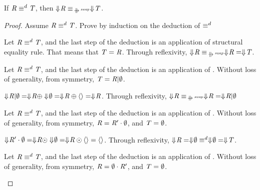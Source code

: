 \documentclass[numbers,10pt,preprint\ifanon ,nocopyrightspace\fi]{sigplanconf}
\begin{document}
\begin{lemma}
  \label{lem:express-equiv-in-equiv-swap}
  If $\mathit{R} \equiv^d \mathit{T}$, then
  $\ToDNFRegexOf{\Regex} \EquivalenceOf{\ParallelRewriteSwap}
  \ToDNFRegexOf{\RegexAlt}$.
\end{lemma}
\begin{proof}
  Assume $\mathit{R} \equiv^d \mathit{T}$.
  Prove by induction on the deduction of $\equiv^d$
  \begin{case}
    Let $\mathit{R} \equiv^d \mathit{T}$, and the last step of the
    deduction is an application of structural equality rule.
    That means that $\mathit{T}
    = \mathit{R}$.  Through reflexivity, $\ToDNFRegexOf{\Regex}
    \EquivalenceOf{\ParallelRewriteSwap} \ToDNFRegexOf{\Regex} =
    \ToDNFRegexOf{\RegexAlt}$.
  \end{case}

  \begin{case}[\OrIdentityRule{}]
    Let $\mathit{R} \equiv^d \mathit{T}$, and the last step of the
    deduction is an application of \OrIdentityRule{}.  Without loss of
    generality, from symmetry, $\mathit{T} = \mathit{R} | \emptyset$.
  
    $\Downarrow\mkern-4mu \mathit{R} | \emptyset = \Downarrow\mkern-4mu \mathit{R} \oplus
    \Downarrow\mkern-4mu \emptyset = \Downarrow\mkern-4mu \mathit{R} \oplus \langle\rangle =
    \Downarrow\mkern-4mu \mathit{R}$.  Through reflexivity, $\ToDNFRegexOf{\Regex}
    \EquivalenceOf{\ParallelRewriteSwap} \ToDNFRegexOf{\Regex} =
    \ToDNFRegexOf{\Regex \Or \emptyset}$
  \end{case}
  
  \begin{case}[\EmptyProjectionRightRule{}]
    Let $\mathit{R} \equiv^d \mathit{T}$, and the last step of the
    deduction is an application of \EmptyProjectionRightRule{}.  Without
    loss of generality, from symmetry, $\mathit{R} = \mathit{R}' \cdot \emptyset$, and
    $\mathit{T} = \emptyset$.

    $\Downarrow\mkern-4mu \mathit{R}' \cdot \emptyset = \Downarrow\mkern-4mu \mathit{R} \odot
    \Downarrow\mkern-4mu \emptyset = \Downarrow\mkern-4mu \mathit{R} \odot \langle\rangle =
    \langle\rangle$.  Through reflexivity, $\Downarrow\mkern-4mu \mathit{R} =
    \Downarrow\mkern-4mu \emptyset \equiv^d \Downarrow\mkern-4mu \emptyset =
    \Downarrow\mkern-4mu \mathit{T}$.
  \end{case}
  
  \begin{case}[\EmptyProjectionLeftRule{}]
    Let $\mathit{R} \equiv^d \mathit{T}$, and the last step of the
    deduction is an application of \EmptyProjectionRightRule{}.  Without
    loss of generality, from symmetry, $\mathit{R} = \emptyset \cdot \mathit{R}'$, and
    $\mathit{T} = \emptyset$.


\end{case}
\end{proof}
\end{document}
